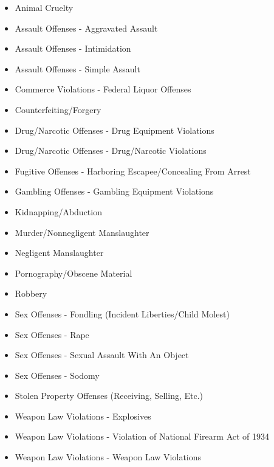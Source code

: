 \documentclass[
]{krantz}
\providecommand{\tightlist}{%
  \setlength{\itemsep}{0pt}\setlength{\parskip}{0pt}}
\begin{document}
\begin{itemize}
\tightlist
\item
  Animal Cruelty
\item
  Assault Offenses - Aggravated Assault
\item
  Assault Offenses - Intimidation
\item
  Assault Offenses - Simple Assault
\item
  Commerce Violations - Federal Liquor Offenses
\item
  Counterfeiting/Forgery
\item
  Drug/Narcotic Offenses - Drug Equipment Violations
\item
  Drug/Narcotic Offenses - Drug/Narcotic Violations
\item
  Fugitive Offenses - Harboring Escapee/Concealing From
  Arrest
\item
  Gambling Offenses - Gambling Equipment Violations
\item
  Kidnapping/Abduction
\item
  Murder/Nonnegligent Manslaughter
\item
  Negligent Manslaughter
\item
  Pornography/Obscene Material
\item
  Robbery
\item
  Sex Offenses - Fondling (Incident Liberties/Child Molest)
\item
  Sex Offenses - Rape
\item
  Sex Offenses - Sexual Assault With An Object
\item
  Sex Offenses - Sodomy
\item
  Stolen Property Offenses (Receiving, Selling, Etc.)
\item
  Weapon Law Violations - Explosives
\item
  Weapon Law Violations - Violation of National Firearm Act
  of 1934
\item
  Weapon Law Violations - Weapon Law Violations
\end{itemize}
\end{document}
